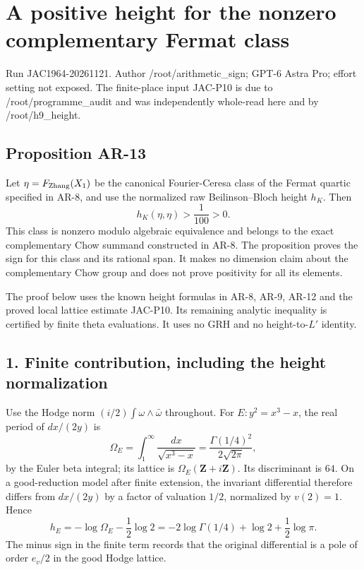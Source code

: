\documentclass[11pt,a4paper]{article}
\begin{document}
\section{A positive height for the nonzero complementary Fermat
class}\label{a-positive-height-for-the-nonzero-complementary-fermat-class}

Run JAC1964-20261121. Author /root/arithmetic\_sign; GPT-6 Astra Pro;
effort setting not exposed. The finite-place input JAC-P10 is due to
/root/programme\_audit and was independently whole-read here and by
/root/h9\_height.

\subsection{Proposition AR-13}\label{proposition-ar-13}

Let \(\eta=F_{\rm Zhang}(X_1)\) be the canonical Fourier-Ceresa class of
the Fermat quartic specified in AR-8, and use the normalized raw
Beilinson--Bloch height \(h_K\). Then \[
h_K(\eta,\eta)>\frac1{100}>0.
\tag{AR.22}
\] This class is nonzero modulo algebraic equivalence and belongs to the
exact complementary Chow summand constructed in AR-8. The proposition
proves the sign for this class and its rational span. It makes no
dimension claim about the complementary Chow group and does not prove
positivity for all its elements.

The proof below uses the known height formulas in AR-8, AR-9, AR-12 and
the proved local lattice estimate JAC-P10. Its remaining analytic
inequality is certified by finite theta evaluations. It uses no GRH and
no height-to-\(L'\) identity.

\subsection{1. Finite contribution, including the height
normalization}\label{finite-contribution-including-the-height-normalization}

Use the Hodge norm \((i/2)\int\omega\wedge\bar\omega\) throughout. For
\(E:y^2=x^3-x\), the real period of \(dx/(2y)\) is \[
\Omega_E=\int_1^\infty\frac{dx}{\sqrt{x^3-x}}
 =\frac{\Gamma(1/4)^2}{2\sqrt{2\pi}},
\] by the Euler beta integral; its lattice is
\(\Omega_E(\mathbf Z+i\mathbf Z)\). Its discriminant is \(64\). On a
good-reduction model after finite extension, the invariant differential
therefore differs from \(dx/(2y)\) by a factor of valuation \(1/2\),
normalized by \(v(2)=1\). Hence \[
h_E=-\log\Omega_E-\frac12\log2
   =-2\log\Gamma(1/4)+\log2+\frac12\log\pi.
\tag{AR.23}
\] The minus sign in the finite term records that the original
differential is a pole of order \(e_v/2\) in the good Hodge lattice.
\end{document}
